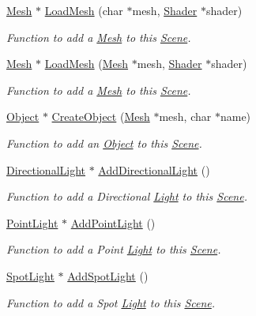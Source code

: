 \begin{DoxyCompactItemize}
\hyperlink{class_mesh}{Mesh} $\ast$ \hyperlink{class_scene_a660e1d1c0aebaff994ea6d36d1e9fec5}{Load\+Mesh} (char $\ast$mesh, \hyperlink{class_shader}{Shader} $\ast$shader)
\begin{DoxyCompactList}\small\item\em Function to add a \hyperlink{class_mesh}{Mesh} to this \hyperlink{class_scene}{Scene}. \end{DoxyCompactList}\item 
\hyperlink{class_mesh}{Mesh} $\ast$ \hyperlink{class_scene_a676cf764adad1d7e30311582ccae2b7e}{Load\+Mesh} (\hyperlink{class_mesh}{Mesh} $\ast$mesh, \hyperlink{class_shader}{Shader} $\ast$shader)
\begin{DoxyCompactList}\small\item\em Function to add a \hyperlink{class_mesh}{Mesh} to this \hyperlink{class_scene}{Scene}. \end{DoxyCompactList}\item 
\hyperlink{class_object}{Object} $\ast$ \hyperlink{class_scene_adfdea29bf0ed9107c28f99fb8ebe34d1}{Create\+Object} (\hyperlink{class_mesh}{Mesh} $\ast$mesh, char $\ast$name)
\begin{DoxyCompactList}\small\item\em Function to add an \hyperlink{class_object}{Object} to this \hyperlink{class_scene}{Scene}. \end{DoxyCompactList}\item 
\hyperlink{class_directional_light}{Directional\+Light} $\ast$ \hyperlink{class_scene_a8ba56754e230d7a99736c5232bd912ea}{Add\+Directional\+Light} ()
\begin{DoxyCompactList}\small\item\em Function to add a Directional \hyperlink{class_light}{Light} to this \hyperlink{class_scene}{Scene}. \end{DoxyCompactList}\item 
\hyperlink{class_point_light}{Point\+Light} $\ast$ \hyperlink{class_scene_ac33b9cc536096a447892f524802dd2ec}{Add\+Point\+Light} ()
\begin{DoxyCompactList}\small\item\em Function to add a Point \hyperlink{class_light}{Light} to this \hyperlink{class_scene}{Scene}. \end{DoxyCompactList}\item 
\hyperlink{class_spot_light}{Spot\+Light} $\ast$ \hyperlink{class_scene_a5086a9e37b94c2dfb30dfacbee668c79}{Add\+Spot\+Light} ()
\begin{DoxyCompactList}\small\item\em Function to add a Spot \hyperlink{class_light}{Light} to this \hyperlink{class_scene}{Scene}. \end{DoxyCompactList}\end{DoxyCompactItemize}
